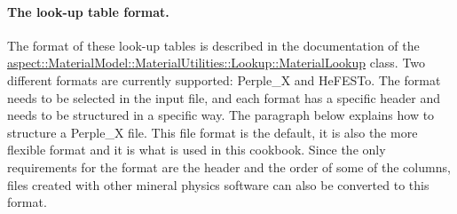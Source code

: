 \paragraph{The look-up table format.}
The format of these look-up tables is described in the documentation of the \href{https://aspect.geodynamics.org/doc/doxygen/classaspect_1_1MaterialModel_1_1MaterialUtilities_1_1Lookup_1_1MaterialLookup.html}{aspect::MaterialModel::MaterialUtilities::Lookup::MaterialLookup} class.
Two different formats are currently supported: Perple\_X and HeFESTo. 
The format needs to be selected in the input file, and each format has a specific header and needs to be structured in a specific way. The paragraph below explains how to structure a Perple\_X file. 
This file format is the default, it is also the more flexible format and it is what is used in this cookbook. Since the only requirements for the format are the header and the order of some of the columns, 
files created with other mineral physics software can also be converted to this format.  

